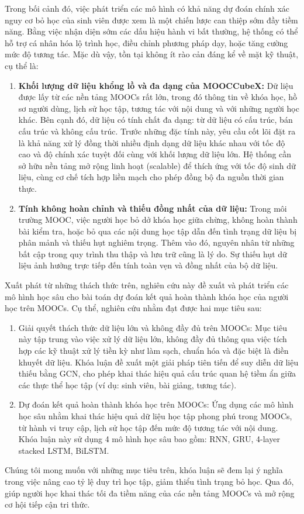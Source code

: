 Trong bối cảnh đó, việc phát triển các mô hình có khả năng dự đoán chính xác nguy cơ bỏ học của sinh viên được xem là một chiến lược can thiệp sớm đầy tiềm năng. Bằng việc nhận diện sớm các dấu hiệu hành vi bất thường, hệ thống có thể hỗ trợ cá nhân hóa lộ trình học, điều chỉnh phương pháp dạy, hoặc tăng cường mức độ tương tác. Mặc dù vậy, tồn tại không ít rào cản đáng kể về mặt kỹ thuật, cụ thể là:
\begin{enumerate}
    \item \textbf{Khối lượng dữ liệu khổng lồ và đa dạng của MOOCCubeX:} Dữ liệu được lấy từ các nền tảng MOOCs rất lớn, trong đó thông tin về khóa học, hồ sơ người dùng, lịch sử học tập, tương tác với nội dung và với những người học khác. Bên cạnh đó, dữ liệu có tính chất đa dạng: từ dữ liệu có cấu trúc, bán cấu trúc và không cấu trúc. Trước những đặc tính này, yêu cầu cốt lõi đặt ra là khả năng xử lý đồng thời nhiều định dạng dữ liệu khác nhau với tốc độ cao và độ chính xác tuyệt đối cùng với khối lượng dữ liệu lớn. Hệ thống cần sở hữu nền tảng mở rộng linh hoạt (scalable) để thích ứng với tốc độ sinh dữ liệu, cùng cơ chế tích hợp liền mạch cho phép đồng bộ đa nguồn thời gian thực. 

    \item \textbf{Tính không hoàn chỉnh và thiếu đồng nhất của dữ liệu:} Trong môi trường MOOC, việc người học bỏ dở khóa học giữa chừng, không hoàn thành bài kiểm tra, hoặc bỏ qua các nội dung học tập dẫn đến tình trạng dữ liệu bị phân mảnh và thiếu hụt nghiêm trọng. Thêm vào đó, nguyên nhân từ những bất cập trong quy trình thu thập và lưu trữ cũng là lý do. Sự thiếu hụt dữ liệu ảnh hưởng trực tiếp đến tính toàn vẹn và đồng nhất của bộ dữ liệu.
\end{enumerate}

Xuất phát từ những thách thức trên, nghiên cứu này đề xuất và phát triển các mô hình học sâu cho bài toán dự đoán kết quả hoàn thành khóa học của người học trên MOOCs. Cụ thể, nghiên cứu nhằm đạt được hai mục tiêu sau:
\begin{enumerate}
    \item Giải quyết thách thức dữ liệu lớn và không đầy đủ trên MOOCs: Mục tiêu này tập trung vào việc xử lý dữ liệu lớn, không đầy đủ thông qua việc tích hợp các kỹ thuật xử lý tiền kỳ như làm sạch, chuẩn hóa và đặc biệt là điền khuyết dữ liệu. Khóa luận đề xuất một giải pháp tiên tiến để suy diễn dữ liệu thiếu bằng GCN, cho phép khai thác hiệu quả cấu trúc quan hệ tiềm ẩn giữa các thực thể học tập (ví dụ: sinh viên, bài giảng, tương tác).
    
    \item Dự đoán kết quả hoàn thành khóa học trên MOOCs: Ứng dụng các mô hình học sâu nhằm khai thác hiệu quả dữ liệu học tập phong phú trong MOOCs, từ hành vi truy cập, lịch sử học tập đến mức độ tương tác với nội dung. Khóa luận này sử dụng 4 mô hình học sâu bao gồm: RNN, GRU, 4-layer stacked LSTM, BiLSTM.
\end{enumerate}
Chúng tôi mong muốn với những mục tiêu trên, khóa luận sẽ đem lại ý nghĩa trong việc nâng cao tỷ lệ duy trì học tập, giảm thiểu tình trạng bỏ học. Qua đó, giúp người học khai thác tối đa tiềm năng của các nền tảng MOOCs và mở rộng cơ hội tiếp cận tri thức.



